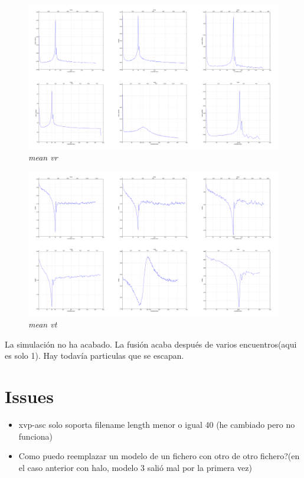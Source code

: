 \documentclass[12pt]{book}
\begin{document}
\begin{figure}[h!]
 \centering
 \includegraphics[scale=0.1]{vr.png}
 \caption{\emph{mean vr}}
 \label{Fig: 5}
\end{figure}

\begin{figure}[h!]
 \centering
 \includegraphics[scale=0.1]{vt.png}
 \caption{\emph{mean vt}}
 \label{Fig: 5}
\end{figure}

La simulación no ha acabado. La fusión acaba después de varios encuentros(aqui es solo 1). Hay todavía particulas que se escapan.


\section*{Issues}
\begin{itemize}
\item xvp-asc solo soporta filename length menor o igual 40 (he cambiado pero no funciona)
\item Como puedo reemplazar un modelo de un fichero con otro de otro fichero?(en el caso anterior con halo, modelo 3 salió mal por la primera vez)
\end{itemize}
\end{document}
